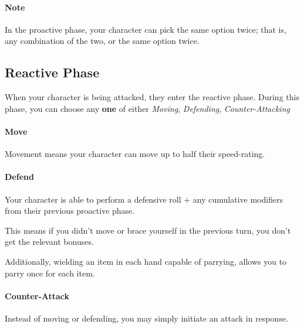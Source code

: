 \paragraph{Note} In the proactive phase, your character can pick the same option twice; that is, any combination of the two, or the same option twice.

\subsection{Reactive Phase}
When your character is being attacked, they enter the reactive phase.
During this phase, you can choose any \textbf{one} of either \textit{Moving}, \textit{Defending}, \textit{Counter-Attacking}

\paragraph{Move}
Movement means your character can move up to half their speed-rating.

\paragraph{Defend}
Your character is able to perform a defensive roll + any cumulative modifiers from their previous proactive phase.

This means if you didn't move or brace yourself in the previous turn, you don't get the relevant bonuses.

Additionally, wielding an item in each hand capable of parrying, allows you to parry once for each item.

\paragraph{Counter-Attack}
Instead of moving or defending, you may simply initiate an attack in response.